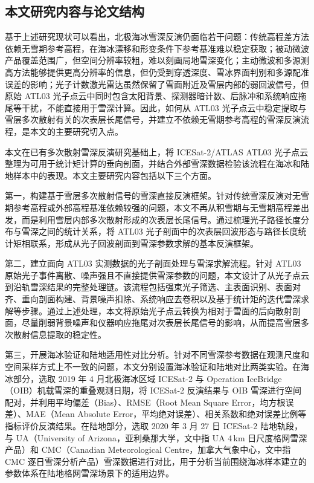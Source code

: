 \subsection{本文研究内容与论文结构}

基于上述研究现状可以看出，北极海冰雪深反演仍面临若干问题：传统高程差方法依赖无雪期参考高程，在海冰漂移和形变条件下参考基准难以稳定获取；被动微波产品覆盖范围广，但空间分辨率较粗，难以刻画局地雪深变化；主动微波和多源测高方法能够提供更高分辨率的信息，但仍受到穿透深度、雪冰界面判别和多源配准误差的影响；光子计数激光雷达虽然保留了雪面附近及雪层内部的弱回波信号，但原始 ATL03 光子点云中同时包含太阳背景、探测器暗计数、后脉冲和系统响应拖尾等干扰，不能直接用于雪深计算。因此，如何从 ATL03 光子点云中稳定提取与雪层多次散射有关的次表层长尾信号，并建立不依赖无雪期参考高程的雪深反演流程，是本文的主要研究切入点。

本文在已有多次散射雪深反演研究基础上，将 ICESat-2/ATLAS ATL03 光子点云整理为可用于统计矩计算的垂向剖面，并结合外部雪深数据检验该流程在海冰和陆地样本中的表现。本文主要研究内容包括以下三个方面。

第一，构建基于雪层多次散射信号的雪深直接反演框架。针对传统雪深反演对无雪期参考高程或外部高程基准依赖较强的问题，本文不再从积雪期与无雪期高程差出发，而是利用雪层内部多次散射形成的次表层长尾信号。通过梳理光子路径长度分布与雪深之间的统计关系，将 ATL03 光子剖面中的次表层回波形态与路径长度统计矩相联系，形成从光子回波剖面到雪深参数求解的基本反演框架。

第二，建立面向 ATL03 实测数据的光子剖面处理与雪深求解流程。针对 ATL03 原始光子事件离散、噪声强且不直接提供雪深参数的问题，本文设计了从光子点云到沿轨雪深结果的完整处理链。该流程包括强束光子筛选、主表面识别、表面对齐、垂向剖面构建、背景噪声扣除、系统响应去卷积以及基于统计矩的迭代雪深求解等步骤。通过上述处理，本文将原始光子点云转换为相对于雪面的后向散射剖面，尽量削弱背景噪声和仪器响应拖尾对次表层长尾信号的影响，从而提高雪层多次散射信息提取的稳定性。

第三，开展海冰验证和陆地适用性对比分析。针对不同雪深参考数据在观测尺度和空间采样方式上不一致的问题，本文分别设置海冰验证和陆地对比两类实验。在海冰部分，选取 2019 年 4 月北极海冰区域 ICESat-2 与 Operation IceBridge（OIB）机载雪深的重叠观测日期，将 ICESat-2 反演结果与 OIB 雪深进行空间配对，并利用平均偏差（Bias）、RMSE（Root Mean Square Error，均方根误差）、MAE（Mean Absolute Error，平均绝对误差）、相关系数和绝对误差比例等指标评价反演结果。在陆地部分，选取 2020 年 3 月 27 日 ICESat-2 陆地轨段，与 UA（University of Arizona，亚利桑那大学，文中指 UA 4\,km 日尺度格网雪深产品）和 CMC（Canadian Meteorological Centre，加拿大气象中心，文中指 CMC 逐日雪深分析产品）雪深数据进行对比，用于分析当前围绕海冰样本建立的参数体系在陆地格网雪深场景下的适用边界。

